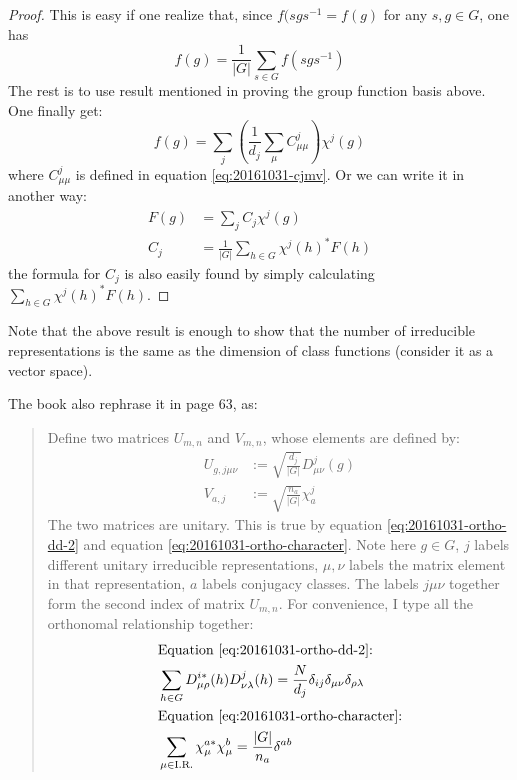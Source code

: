     \begin{proof}
        This is easy if one realize that, since $f(sgs^{-1}=f(g)$ for
        any $s,g\in G$, one has
        \begin{equation}
            f(g) = \frac{1}{|G|} \sum_{s\in G} f(s g s^{-1})
        \end{equation}
        The rest is to use result mentioned in proving the group
        function basis above. One finally get:
        \begin{equation}
            f(g) = \sum_j \left(\frac{1}{d_j}\sum_\mu
            C^j_{\mu\mu}\right) \chi^j(g)
        \end{equation}
        where $C^j_{\mu\mu}$ is defined in equation
        \ref{eq:20161031-cjmv}.
        Or we can write it in another way:
        \begin{align}
            F(g) &= \sum_j C_j \chi^j(g) \\
            C_j &= \frac{1}{|G|} \sum_{h\in G}\chi^j(h)^* F(h)
        \end{align}
        the formula for $C_j$ is also easily found by simply
        calculating $\sum_{h\in G}\chi^j(h)^* F(h)$.
    \end{proof}
    Note that the above result is enough to show that the number of
    irreducible representations is the same as the dimension of
    class functions (consider it as a vector space).

    The book \cite{book} also rephrase it in page 63, as:
    \begin{quote}
        Define two matrices $U_{m,n}$ and $V_{m,n}$, whose elements
        are defined by:
    \begin{align}
        U_{g,j\mu\nu} &:= \sqrt{\frac{d_j}{|G|}} D^j_{\mu\nu}(g) \\
        V_{a,j} &:= \sqrt{\frac{n_a}{|G|}} \chi^j_a
    \end{align}
    The two matrices are unitary. This is true by equation
    \ref{eq:20161031-ortho-dd-2} and equation
    \ref{eq:20161031-ortho-character}. Note here $g\in G$, $j$ labels
    different unitary irreducible representations, $\mu,\nu$ labels
    the matrix element in that representation, $a$ labels conjugacy
    classes. The labels $j\mu\nu$ together form the second index of
    matrix $U_{m,n}$. For convenience, I type all the orthonomal
    relationship together:
    \begin{align}
        &\text{Equation \ref{eq:20161031-ortho-dd-2}:} \nonumber \\
        & \sum_{h\in G} D^{i*}_{\mu\rho}(h)D^j_{\nu \lambda}(h) =
        \frac{N}{d_j} \delta_{ij} \delta_{\mu\nu}\delta_{\rho\lambda}
        \\
        &\text{Equation \ref{eq:20161031-ortho-character}:} \nonumber \\
        & \sum_{\mu \in \text{I.R.}} \chi^{a*}_\mu\chi^b_\mu = 
            \frac{|G|}{n_a} \delta^{ab} 
    \end{align}

    \end{quote}
    
